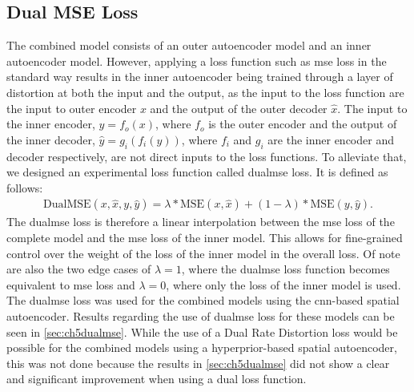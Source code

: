 \subsection{Dual MSE Loss}
The combined model consists of an outer autoencoder model and an inner autoencoder model. However, applying a loss function such as \ac{mse} loss in the standard way results in the inner autoencoder being trained through a layer of distortion at both the input and the output, as the input to the loss function are the input to outer encoder $x$ and the output of the outer decoder $\hat{x}$. The input to the inner encoder, $y=f_o(x)$, where $f_o$ is the outer encoder and the output of the inner decoder, $\hat{y}=g_i(f_i(y))$, where $f_i$ and $g_i$ are the inner encoder and decoder respectively, are not direct inputs to the loss functions. To alleviate that, we designed an experimental loss function called \ac{dualmse} loss. It is defined as follows:
\begin{align*}
\text{DualMSE}(x,\hat{x},y,\hat{y}) = \lambda * \text{MSE}(x,\hat{x}) + (1-\lambda) *  \text{MSE}(y,\hat{y}).
\end{align*}
The \ac{dualmse} loss is therefore a linear interpolation between the \ac{mse} loss of the complete model and the \ac{mse} loss of the inner model. This allows for fine-grained control over the weight of the loss of the inner model in the overall loss. Of note are also the two edge cases of $\lambda = 1$, where the \ac{dualmse} loss function becomes equivalent to \ac{mse} loss and $\lambda = 0$, where only the loss of the inner model is used. The \ac{dualmse} loss was used for the combined models using the \ac{cnn}-based spatial autoencoder. Results regarding the use of \ac{dualmse} loss for these models can be seen in \autoref{sec:ch5dualmse}. While the use of a Dual Rate Distortion loss would be possible for the combined models using a hyperprior-based spatial autoencoder, this was not done because the results in \autoref{sec:ch5dualmse} did not show a clear and significant improvement when using a dual loss function.

